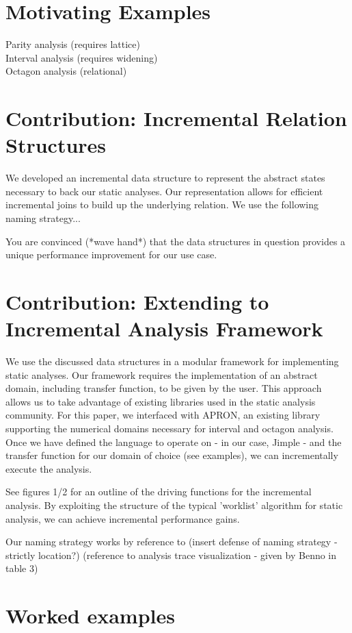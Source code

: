 \documentclass[acmlarge,anonymous]{acmart}\settopmatter{printfolios=true}
\begin{document}
\section{Motivating Examples}

Parity analysis (requires lattice)\\
Interval analysis (requires widening)\\
Octagon analysis (relational)

\section{Contribution: Incremental Relation Structures}

We developed an incremental data structure to represent the abstract states necessary to back our static analyses. Our representation allows for efficient incremental joins to build up the underlying relation. We use the following naming strategy...

You are convinced (*wave hand*) that the data structures in question provides a unique performance improvement for our use case.

\section{Contribution: Extending to Incremental Analysis Framework}

We use the discussed data structures in a modular framework for implementing static analyses. Our framework requires the implementation of an abstract domain, including transfer function, to be given by the user. This approach allows us to take advantage of existing libraries used in the static analysis community. For this paper, we interfaced with APRON, an existing library supporting the numerical domains necessary for interval and octagon analysis. Once we have defined the language to operate on - in our case, Jimple - and the transfer function for our domain of choice (see examples), we can incrementally execute the analysis.

See figures 1/2 for an outline of the driving functions for the incremental analysis. By exploiting the structure of the typical 'worklist' algorithm for static analysis, we can achieve incremental performance gains. 

Our naming strategy works by reference to (insert defense of naming strategy - strictly location?) (reference to analysis trace visualization - given by Benno in table 3)

\section{Worked examples}
\end{document}
